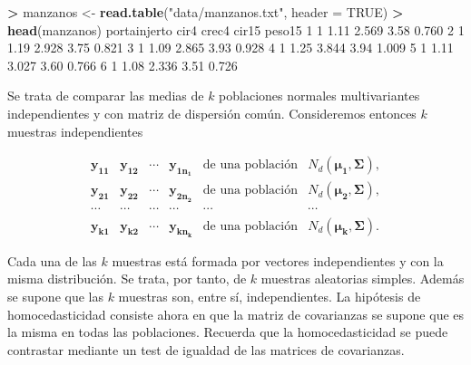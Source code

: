 \documentclass[
  a4paper,
  oneside]{scrbook}
\newenvironment{Shaded}{\begin{snugshade}}{\end{snugshade}}
\newcommand{\AttributeTok}[1]{\textcolor[rgb]{0.13,0.29,0.53}{#1}}
\newcommand{\ConstantTok}[1]{\textcolor[rgb]{0.56,0.35,0.01}{#1}}
\newcommand{\DecValTok}[1]{\textcolor[rgb]{0.00,0.00,0.81}{#1}}
\newcommand{\FloatTok}[1]{\textcolor[rgb]{0.00,0.00,0.81}{#1}}
\newcommand{\FunctionTok}[1]{\textcolor[rgb]{0.13,0.29,0.53}{\textbf{#1}}}
\newcommand{\NormalTok}[1]{#1}
\newcommand{\OtherTok}[1]{\textcolor[rgb]{0.56,0.35,0.01}{#1}}
\newcommand{\SpecialCharTok}[1]{\textcolor[rgb]{0.81,0.36,0.00}{\textbf{#1}}}
\newcommand{\StringTok}[1]{\textcolor[rgb]{0.31,0.60,0.02}{#1}}
\theoremstyle{definition}
\theoremstyle{definition}
\theoremstyle{definition}
\theoremstyle{definition}
\theoremstyle{remark}
\begin{document}
\footnotesize

\begin{Shaded}
\begin{Highlighting}[]
\SpecialCharTok{\textgreater{}}\NormalTok{ manzanos }\OtherTok{\textless{}{-}} \FunctionTok{read.table}\NormalTok{(}\StringTok{"data/manzanos.txt"}\NormalTok{, }\AttributeTok{header =} \ConstantTok{TRUE}\NormalTok{)}
\SpecialCharTok{\textgreater{}} \FunctionTok{head}\NormalTok{(manzanos)}
\NormalTok{  portainjerto cir4 crec4 cir15 peso15}
\DecValTok{1}            \DecValTok{1} \FloatTok{1.11} \FloatTok{2.569}  \FloatTok{3.58}  \FloatTok{0.760}
\DecValTok{2}            \DecValTok{1} \FloatTok{1.19} \FloatTok{2.928}  \FloatTok{3.75}  \FloatTok{0.821}
\DecValTok{3}            \DecValTok{1} \FloatTok{1.09} \FloatTok{2.865}  \FloatTok{3.93}  \FloatTok{0.928}
\DecValTok{4}            \DecValTok{1} \FloatTok{1.25} \FloatTok{3.844}  \FloatTok{3.94}  \FloatTok{1.009}
\DecValTok{5}            \DecValTok{1} \FloatTok{1.11} \FloatTok{3.027}  \FloatTok{3.60}  \FloatTok{0.766}
\DecValTok{6}            \DecValTok{1} \FloatTok{1.08} \FloatTok{2.336}  \FloatTok{3.51}  \FloatTok{0.726}
\end{Highlighting}
\end{Shaded}

\normalsize

Se trata de comparar las medias de \(k\) poblaciones normales
multivariantes independientes y con matriz de dispersión común.
Consideremos entonces \(k\) muestras independientes

\[\begin{array}{cccccc}
\bm{y_{11}} & \bm{y_{12}} & \cdots & \bm{y_{1n_1}} & \mbox{de una población} & N_d(\bm{\mu_1},\bm\Sigma), \\
\bm{y_{21}} & \bm{y_{22}} & \cdots & \bm{y_{2n_2}} & \mbox{de una población} & N_d(\bm{\mu_2},\bm\Sigma), \\
\cdots & \cdots & \cdots & \cdots & \cdots & \cdots \\
\bm{y_{k1}} & \bm{y_{k2}} & \cdots & \bm{y_{kn_k}} &\mbox{de una población} & N_d(\bm{\mu_k},\bm\Sigma).
\end{array}\]

Cada una de las \(k\) muestras está formada por vectores independientes y
con la misma distribución. Se trata, por tanto, de \(k\) muestras
aleatorias simples. Además se supone que las \(k\) muestras son, entre sí,
independientes. La hipótesis de homocedasticidad consiste ahora en que
la matriz de covarianzas se supone que es la misma en todas las
poblaciones. Recuerda que la homocedasticidad se puede contrastar
mediante un test de igualdad de las matrices de covarianzas.
\end{document}
